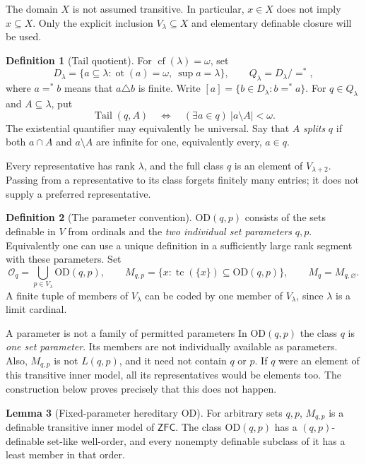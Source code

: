 \documentclass[11pt,letterpaper]{article}
\theoremstyle{definition}
\newtheorem{definition}{Definition}[section]
\newtheorem{lemma}[definition]{Lemma}
\numberwithin{equation}{section}
\newcommand{\ZFC}{\mathsf{ZFC}}
\newcommand{\OD}{\mathrm{OD}}
\newcommand{\cf}{\operatorname{cf}}
\newcommand{\ot}{\operatorname{ot}}
\newcommand{\tc}{\operatorname{tc}}
\newcommand{\Tail}{\operatorname{Tail}}
\begin{document}
The domain $X$ is not assumed transitive. In particular,
$x\in X$ does not imply $x\subseteq X$. Only the explicit inclusion
$V_\lambda\subseteq X$ and elementary definable closure will be used.

\begin{definition}[Tail quotient]\label{def:tail}
For $\cf(\lambda)=\omega$, set
\[
 D_\lambda=\{a\subseteq\lambda:\ot(a)=\omega,\ \sup a=\lambda\},
 \qquad Q_\lambda=D_\lambda/{=^*},
\]
where $a=^*b$ means that $a\triangle b$ is finite. Write
$[a]=\{b\in D_\lambda:b=^*a\}$. For $q\in Q_\lambda$ and $A\subseteq\lambda$,
put
\[
 \Tail(q,A)\quad\Longleftrightarrow\quad
 (\exists a\in q)\ |a\setminus A|<\omega.
\]
The existential quantifier may equivalently be universal. Say that
$A$ \emph{splits} $q$ if both $a\cap A$ and $a\setminus A$ are infinite
for one, equivalently every, $a\in q$.
\end{definition}

Every representative has rank $\lambda$, and the full class $q$ is an
element of $V_{\lambda+2}$. Passing from a representative to its class
forgets finitely many entries; it does not supply a preferred
representative.

\begin{definition}[The parameter convention]\label{def:hod}
$\OD(q,p)$ consists of the sets definable in $V$ from ordinals and the
\emph{two individual set parameters} $q,p$. Equivalently one can use a
unique definition in a sufficiently large rank segment with these
parameters. Set
\[
 \mathcal O_q=\bigcup_{p\in V_\lambda}\OD(q,p),
 \qquad
 M_{q,p}=\{x:\tc(\{x\})\subseteq\OD(q,p)\},
 \qquad M_q=M_{q,\varnothing}.
\]
A finite tuple of members of $V_\lambda$ can be coded by one member of
$V_\lambda$, since $\lambda$ is a limit cardinal.
\end{definition}

\begin{assessment}{A parameter is not a family of permitted parameters}
In $\OD(q,p)$ the class $q$ is \emph{one set parameter}.
Its members are not individually available as parameters. Also,
$M_{q,p}$ is not $L(q,p)$, and it need not contain $q$ or $p$.
If $q$ were an element of this transitive inner model, all its
representatives would be elements too. The construction below proves
precisely that this does not happen.
\end{assessment}

\begin{lemma}[Fixed-parameter hereditary OD]\label{lem:hod}
For arbitrary sets $q,p$, $M_{q,p}$ is a definable transitive inner model
of $\ZFC$. The class $\OD(q,p)$ has a $(q,p)$-definable set-like
well-order, and every nonempty definable subclass of it has a least
member in that order.
\end{lemma}
\end{document}
